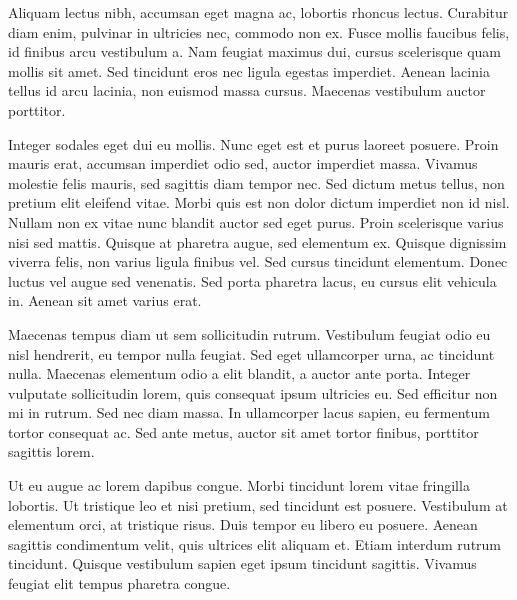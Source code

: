 \documentclass[12pt]{article}
\begin{document}
Aliquam lectus nibh, accumsan eget magna ac, lobortis rhoncus lectus. Curabitur diam enim, pulvinar in ultricies nec, commodo non ex. Fusce mollis faucibus felis, id finibus arcu vestibulum a. Nam feugiat maximus dui, cursus scelerisque quam mollis sit amet. Sed tincidunt eros nec ligula egestas imperdiet. Aenean lacinia tellus id arcu lacinia, non euismod massa cursus. Maecenas vestibulum auctor porttitor.

Integer sodales eget dui eu mollis. Nunc eget est et purus laoreet posuere. Proin mauris erat, accumsan imperdiet odio sed, auctor imperdiet massa. Vivamus molestie felis mauris, sed sagittis diam tempor nec. Sed dictum metus tellus, non pretium elit eleifend vitae. Morbi quis est non dolor dictum imperdiet non id nisl. Nullam non ex vitae nunc blandit auctor sed eget purus. Proin scelerisque varius nisi sed mattis. Quisque at pharetra augue, sed elementum ex. Quisque dignissim viverra felis, non varius ligula finibus vel. Sed cursus tincidunt elementum. Donec luctus vel augue sed venenatis. Sed porta pharetra lacus, eu cursus elit vehicula in. Aenean sit amet varius erat.

Maecenas tempus diam ut sem sollicitudin rutrum. Vestibulum feugiat odio eu nisl hendrerit, eu tempor nulla feugiat. Sed eget ullamcorper urna, ac tincidunt nulla. Maecenas elementum odio a elit blandit, a auctor ante porta. Integer vulputate sollicitudin lorem, quis consequat ipsum ultricies eu. Sed efficitur non mi in rutrum. Sed nec diam massa. In ullamcorper lacus sapien, eu fermentum tortor consequat ac. Sed ante metus, auctor sit amet tortor finibus, porttitor sagittis lorem.

Ut eu augue ac lorem dapibus congue. Morbi tincidunt lorem vitae fringilla lobortis. Ut tristique leo et nisi pretium, sed tincidunt est posuere. Vestibulum at elementum orci, at tristique risus. Duis tempor eu libero eu posuere. Aenean sagittis condimentum velit, quis ultrices elit aliquam et. Etiam interdum rutrum tincidunt. Quisque vestibulum sapien eget ipsum tincidunt sagittis. Vivamus feugiat elit tempus pharetra congue. 
\end{document}
